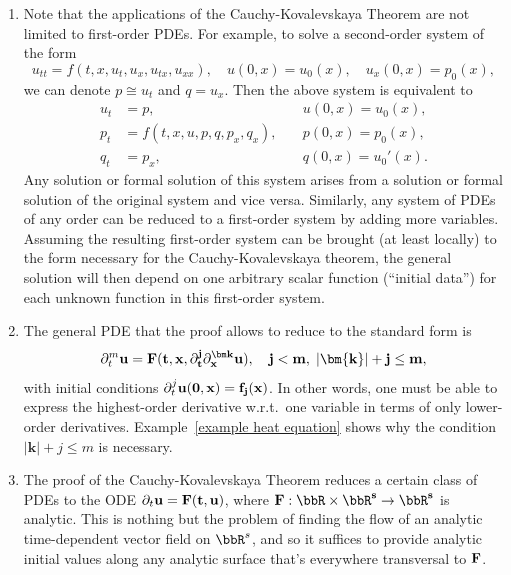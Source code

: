 \begin{rem}
    
\begin{enumerate}
    \item Note that the applications of the Cauchy-Kovalevskaya Theorem are not limited to first-order PDEs. For example, to solve a second-order system of the form 
    \[u_{tt}=f(t,x,u_t,u_x,u_{tx},u_{xx}),\quad u(0,x)=u_0(x),\quad u_x(0,x)=p_0(x),\]
    we can denote $p\cong u_t$ and $q=u_x$. Then the above system is equivalent to 
    \begin{align}
        u_t&=p,\quad &u(0,x)=u_0(x),\\
        p_t&=f(t,x,u,p,q,p_x,q_x),\quad & p(0,x)=p_0(x),\\
        q_t&=p_x,\quad &q(0,x)=u_0'(x).
    \end{align}
    Any solution or formal solution of this system arises from a solution or formal solution of the original system and vice versa. Similarly, any system of PDEs of any order can be reduced to a first-order system by adding more variables. Assuming the resulting first-order system can be brought (at least locally) to the form necessary for the Cauchy-Kovalevskaya theorem, the general solution will then depend on one arbitrary scalar function (``initial data'') for each unknown function in this first-order system. 

    \item The general PDE that the proof allows to reduce to the standard form is 
    \[\partial^{m}_t\bf{u}=\bf{F}(t,x,\partial^j_t\partial^{\bm k}_{\bf x}\bf{u}),\quad j<m,\; |\bm{k}|+j\leq m,\]
    with initial conditions $\partial^j_t\bf{u}(0,\bf{x})=\bf{f}_j(\bf{x})$. In other words, one must be able to express the highest-order derivative w.r.t.\ one variable in terms of only lower-order derivatives. Example~\ref{example heat equation} shows why the condition $|\bm{k}|+j\leq m$ is necessary.

    \item The proof of the Cauchy-Kovalevskaya Theorem reduces a certain class of PDEs to the ODE $\partial_t\bf{u}=\bf{F}(t,\bf{u})$, where $\bf{F}:\bbR\times\bbR^s\to\bbR^s$ is analytic. This is nothing but the problem of finding the flow of an analytic time-dependent vector field on $\bbR^s$, and so it suffices to provide analytic initial values along any analytic surface that's everywhere transversal to $\bf{F}$.
\end{enumerate}
\end{rem}



